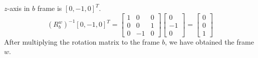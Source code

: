 \documentclass[answers]{exam}
\begin{document}
\begin{questions}
\begin{parts}
\begin{solution}
            $z$-axis in $b$ frame is $[0, -1, 0]^T$.
            \begin{equation*}
                (R^w_b)^{-1} [0, -1, 0]^T = \begin{bmatrix}
                    1 & 0  & 0 \\
                    0 & 0  & 1 \\
                    0 & -1 & 0
                \end{bmatrix}
                \begin{bmatrix}
                    0  \\
                    -1 \\
                    0
                \end{bmatrix}
                = \begin{bmatrix}
                    0 \\
                    0 \\
                    1
                \end{bmatrix}
            \end{equation*}
            After multiplying the rotation matrix to the frame $b$, we have obtained the
            frame $w$.

        \end{solution}


\end{parts}
\end{questions}
\end{document}
